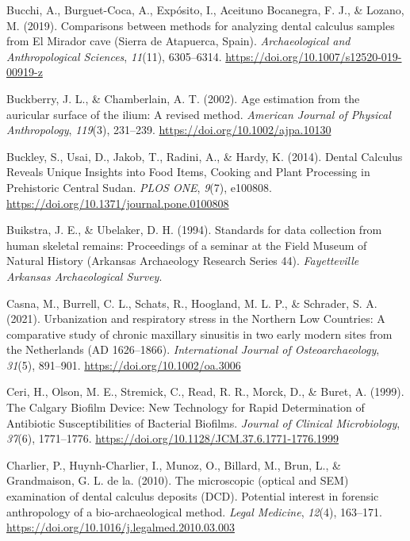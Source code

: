 \documentclass[
  letterpaper,
]{book}
\newlength{\cslhangindent}
\newlength{\cslentryspacingunit} %
\newenvironment{CSLReferences}[2] %
 {%
  \setlength{\parindent}{0pt}
  \ifodd #1
  \let\oldpar\par
  \def\par{\hangindent=\cslhangindent\oldpar}
  \fi
  \setlength{\parskip}{#2\cslentryspacingunit}
 }%
 {}
\begin{document}
\begin{CSLReferences}{1}{0}
\leavevmode{}%
Bucchi, A., Burguet-Coca, A., Expósito, I., Aceituno Bocanegra, F. J.,
\& Lozano, M. (2019). Comparisons between methods for analyzing dental
calculus samples from {El Mirador} cave ({Sierra} de {Atapuerca},
{Spain}). \emph{Archaeological and Anthropological Sciences},
\emph{11}(11), 6305--6314.
\url{https://doi.org/10.1007/s12520-019-00919-z}

\leavevmode{}%
Buckberry, J. L., \& Chamberlain, A. T. (2002). Age estimation from the
auricular surface of the ilium: A revised method. \emph{American Journal
of Physical Anthropology}, \emph{119}(3), 231--239.
\url{https://doi.org/10.1002/ajpa.10130}

\leavevmode{}%
Buckley, S., Usai, D., Jakob, T., Radini, A., \& Hardy, K. (2014).
Dental {Calculus Reveals Unique Insights} into {Food Items}, {Cooking}
and {Plant Processing} in {Prehistoric Central Sudan}. \emph{PLOS ONE},
\emph{9}(7), e100808. \url{https://doi.org/10.1371/journal.pone.0100808}

\leavevmode{}%
Buikstra, J. E., \& Ubelaker, D. H. (1994). Standards for data
collection from human skeletal remains: {Proceedings} of a seminar at
the {Field Museum} of {Natural History} ({Arkansas Archaeology Research
Series} 44). \emph{Fayetteville Arkansas Archaeological Survey}.

\leavevmode{}%
Casna, M., Burrell, C. L., Schats, R., Hoogland, M. L. P., \& Schrader,
S. A. (2021). Urbanization and respiratory stress in the {Northern Low
Countries}: {A} comparative study of chronic maxillary sinusitis in two
early modern sites from the {Netherlands} ({AD} 1626--1866).
\emph{International Journal of Osteoarchaeology}, \emph{31}(5),
891--901. \url{https://doi.org/10.1002/oa.3006}

\leavevmode{}%
Ceri, H., Olson, M. E., Stremick, C., Read, R. R., Morck, D., \& Buret,
A. (1999). The {Calgary Biofilm Device}: {New Technology} for {Rapid
Determination} of {Antibiotic Susceptibilities} of {Bacterial Biofilms}.
\emph{Journal of Clinical Microbiology}, \emph{37}(6), 1771--1776.
\url{https://doi.org/10.1128/JCM.37.6.1771-1776.1999}

\leavevmode{}%
Charlier, P., Huynh-Charlier, I., Munoz, O., Billard, M., Brun, L., \&
Grandmaison, G. L. de la. (2010). The microscopic (optical and {SEM})
examination of dental calculus deposits ({DCD}). {Potential} interest in
forensic anthropology of a bio-archaeological method. \emph{Legal
Medicine}, \emph{12}(4), 163--171.
\url{https://doi.org/10.1016/j.legalmed.2010.03.003}


\end{CSLReferences}
\end{document}
